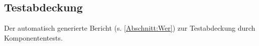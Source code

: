 %



\subsection{Testabdeckung}
\label{Abschnitt:Tests:Statistik:Abdeckung}


Der automatisch generierte Bericht (s. \ref{Abschnitt:Wer}) zur Testabdeckung durch Komponententests.





